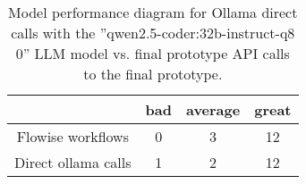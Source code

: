 \begin{table}[H]
\centering
\begin{tabular}[H]{|c|c|c|c|}
\toprule
 & bad & average & great \\
\midrule
Flowise workflows & 0 & 3 & 12 \\
Direct ollama calls & 1 & 2 & 12 \\
\bottomrule
\end{tabular}
\caption{Model performance diagram for Ollama direct calls with the ”qwen2.5-coder:32b-instruct-q8 0” LLM model vs. final prototype API calls to the final prototype.}
\end{table}
